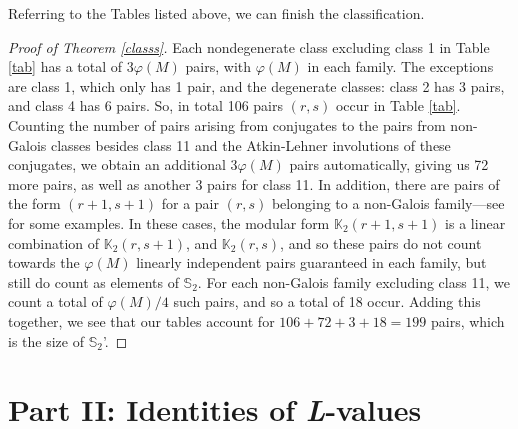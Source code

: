 \documentclass[12pt]{amsart}
\theoremstyle{definition}
\theoremstyle{remark}
\begin{document}
Referring to the Tables listed above, we can finish the classification.

\begin{proof}[Proof of Theorem \ref{classs}]
         Each nondegenerate class excluding class 1 in Table \ref{tab} has a total of $3\varphi(M)$ pairs, with $\varphi(M)$ in each family. The exceptions are class 1, which only has 1 pair, and the degenerate classes: class 2 has 3 pairs, and class 4 has 6 pairs.  So, in total 106 pairs $(r,s)$ occur in Table \ref{tab}. Counting the number of pairs arising from conjugates to the pairs from non-Galois classes besides class 11 and the Atkin-Lehner involutions of these conjugates, we obtain an additional $3\varphi(M)$ pairs automatically, giving us 72 more pairs, as well as another 3 pairs for class 11. In addition, there are pairs of the form $(r+1,s+1)$ for a pair $(r,s)$ belonging to a non-Galois family---see \cite{rosen2} for some examples. In these cases, the modular form $\mathbb{K}_2(r+1,s+1)$ is a linear combination of $\mathbb{K}_2(r,s+1)$, and $\mathbb{K}_2(r,s)$, and so these pairs do not count towards the $\varphi(M)$ linearly independent pairs guaranteed in each family, but still do count as elements of $\mathbb S_2$. For each non-Galois family excluding class 11, we count a total of $\varphi(M)/4$ such pairs, and so a total of 18 occur. Adding this together, we see that our tables account for $106+72+3+18=199$ pairs, which is the size of $\mathbb{S}_2$'. 
\end{proof}







\section{Part II: Identities of \textit{L}-values }























  







 
\end{document}
